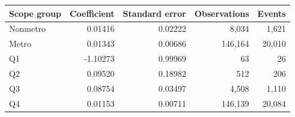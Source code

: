 \begin{tabular}{lrrrr}
\toprule
Scope group & Coefficient & Standard error & Observations & Events \\
\midrule
Nonmetro & 0.01416 & 0.02222 & 8,034 & 1,621 \\
Metro & 0.01343 & 0.00686 & 146,164 & 20,010 \\
Q1 & -1.10273 & 0.99969 & 63 & 26 \\
Q2 & 0.09520 & 0.18982 & 512 & 206 \\
Q3 & 0.08754 & 0.03497 & 4,508 & 1,110 \\
Q4 & 0.01153 & 0.00711 & 146,139 & 20,084 \\
\bottomrule
\end{tabular}
